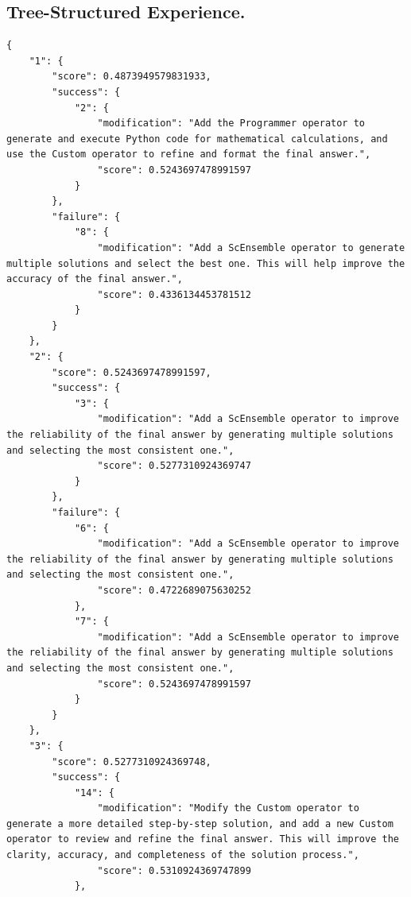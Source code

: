 \subsection{Tree-Structured Experience.}
\begin{tcolorbox}[title={\textbf{\small Processed Experience (formatted as tree sturcture)}}, boxrule=1pt, arc=0mm, colback=black!5!white, colframe=black!75!white, breakable, before skip=10pt, after skip=10pt, pad at break=2mm, parbox=false] \begin{verbatim}
{
    "1": {
        "score": 0.4873949579831933,
        "success": {
            "2": {
                "modification": "Add the Programmer operator to generate and execute Python code for mathematical calculations, and use the Custom operator to refine and format the final answer.",
                "score": 0.5243697478991597
            }
        },
        "failure": {
            "8": {
                "modification": "Add a ScEnsemble operator to generate multiple solutions and select the best one. This will help improve the accuracy of the final answer.",
                "score": 0.4336134453781512
            }
        }
    },
    "2": {
        "score": 0.5243697478991597,
        "success": {
            "3": {
                "modification": "Add a ScEnsemble operator to improve the reliability of the final answer by generating multiple solutions and selecting the most consistent one.",
                "score": 0.5277310924369747
            }
        },
        "failure": {
            "6": {
                "modification": "Add a ScEnsemble operator to improve the reliability of the final answer by generating multiple solutions and selecting the most consistent one.",
                "score": 0.4722689075630252
            },
            "7": {
                "modification": "Add a ScEnsemble operator to improve the reliability of the final answer by generating multiple solutions and selecting the most consistent one.",
                "score": 0.5243697478991597
            }
        }
    },
    "3": {
        "score": 0.5277310924369748,
        "success": {
            "14": {
                "modification": "Modify the Custom operator to generate a more detailed step-by-step solution, and add a new Custom operator to review and refine the final answer. This will improve the clarity, accuracy, and completeness of the solution process.",
                "score": 0.5310924369747899
            },

\end{verbatim}
\end{tcolorbox}
